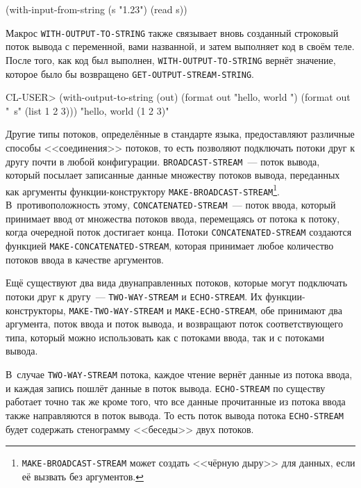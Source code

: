 \begin{myverb}
(with-input-from-string (s "1.23") 
  (read s))
\end{myverb}

Макрос \lstinline{WITH-OUTPUT-TO-STRING} также связывает вновь созданный строковый поток вывода
с переменной, вами названной, и затем выполняет код в своём теле. После того, как код был
выполнен, \lstinline{WITH-OUTPUT-TO-STRING} вернёт значение, которое было бы возвращено
\lstinline{GET-OUTPUT-STREAM-STRING}.
 
\begin{myverb}
CL-USER> (with-output-to-string (out) 
            (format out "hello, world ") 
            (format out "~s" (list 1 2 3))) 
"hello, world (1 2 3)" 
\end{myverb}

Другие типы потоков, определённые в стандарте языка, предоставляют различные способы
<<соединения>> потоков, то есть позволяют подключать потоки друг к другу почти в любой
конфигурации. \lstinline{BROADCAST-STREAM}~--- поток вывода, который посылает записанные данные
множеству потоков вывода, переданных как аргументы функции-конструктору
\lstinline{MAKE-BROADCAST-STREAM}\footnote{\lstinline{MAKE-BROADCAST-STREAM} может создать <<чёрную
  дыру>> для данных, если её вызвать без аргументов.}\hspace{\footnotenegspace}. В~противоположность этому,
\lstinline{CONCATENATED-STREAM}~--- поток ввода, который принимает ввод от множества потоков
ввода, перемещаясь от потока к потоку, когда очередной поток достигает конца. Потоки
\lstinline{CONCATENATED-STREAM} создаются функцией \lstinline{MAKE-CONCATENATED-STREAM}, которая
принимает любое количество потоков ввода в качестве аргументов.

Ещё существуют два вида двунаправленных потоков, которые могут подключать потоки друг к
другу~--- \lstinline{TWO-WAY-STREAM} и \lstinline{ECHO-STREAM}. Их функции-конструкторы,
\lstinline{MAKE-TWO-WAY-STREAM} и \lstinline{MAKE-ECHO-STREAM}, обе принимают два аргумента, поток
ввода и поток вывода, и возвращают поток соответствующего типа, который можно использовать
как с потоками ввода, так и с потоками вывода.

В~случае \lstinline{TWO-WAY-STREAM} потока, каждое чтение вернёт данные из потока ввода, и
каждая запись пошлёт данные в поток вывода. \lstinline{ECHO-STREAM} по существу работает точно
так же кроме того, что все данные прочитанные из потока ввода также направляются в поток
вывода. То есть поток вывода потока \lstinline{ECHO-STREAM} будет содержать стенограмму
<<беседы>> двух потоков.

